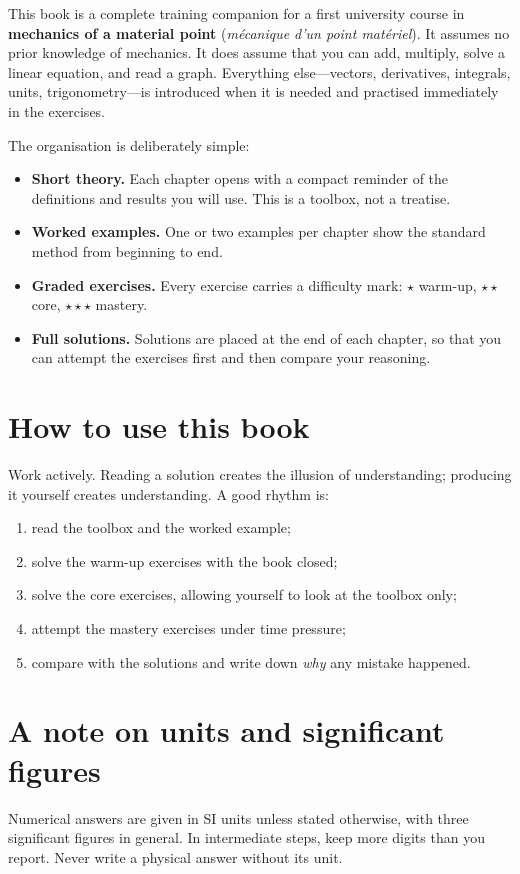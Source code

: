 \documentclass[11pt,oneside,openany]{book}
\newcounter{exercise}[chapter]
\newcounter{example}[chapter]
\newcommand{\warm}{\textcolor{noteframe}{$\star$}}
\newcommand{\core}{\textcolor{exframe}{$\star\star$}}
\newcommand{\mastery}{\textcolor{accent}{$\star\star\star$}}
\begin{document}
This book is a complete training companion for a first university course in
\textbf{mechanics of a material point} (\emph{mécanique d'un point matériel}).
It assumes no prior knowledge of mechanics. It does assume that you can add,
multiply, solve a linear equation, and read a graph. Everything else---vectors,
derivatives, integrals, units, trigonometry---is introduced when it is needed and
practised immediately in the exercises.

The organisation is deliberately simple:

\begin{itemize}[leftmargin=1.4em,itemsep=3pt]
  \item \textbf{Short theory.} Each chapter opens with a compact reminder of the
        definitions and results you will use. This is a toolbox, not a treatise.
  \item \textbf{Worked examples.} One or two examples per chapter show the
        standard method from beginning to end.
  \item \textbf{Graded exercises.} Every exercise carries a difficulty mark:
        \warm{} warm-up, \core{} core, \mastery{} mastery.
  \item \textbf{Full solutions.} Solutions are placed at the end of each chapter,
        so that you can attempt the exercises first and then compare your reasoning.
\end{itemize}

\section*{How to use this book}
Work actively. Reading a solution creates the illusion of understanding; producing
it yourself creates understanding. A good rhythm is:
\begin{enumerate}[leftmargin=1.6em,itemsep=3pt]
  \item read the toolbox and the worked example;
  \item solve the warm-up exercises with the book closed;
  \item solve the core exercises, allowing yourself to look at the toolbox only;
  \item attempt the mastery exercises under time pressure;
  \item compare with the solutions and write down \emph{why} any mistake happened.
\end{enumerate}

\section*{A note on units and significant figures}
Numerical answers are given in SI units unless stated otherwise, with three
significant figures in general. In intermediate steps, keep more digits than you
report. Never write a physical answer without its unit.
\end{document}

